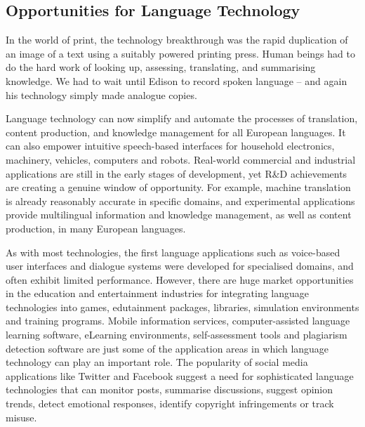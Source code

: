 \begin{multicols}{2}
\subsection{Opportunities for Language Technology}

In the world of print, the technology breakthrough was the rapid duplication of an image of a text using a suitably powered printing press. Human beings had to do the hard work of looking up, assessing, translating, and summarising knowledge. We had to wait until Edison to record spoken language – and again his technology simply made analogue copies.

Language technology can now simplify and automate the processes of translation, content production, and knowledge management for all European languages. It can also empower intuitive speech-based interfaces for household electronics, machinery, vehicles, computers and robots. Real-world commercial and industrial applications are still in the early stages of development, yet R\&D achievements are creating a genuine window of opportunity. For example, machine translation is already reasonably accurate in specific domains, and experimental applications provide multilingual information and knowledge management, as well as content production, in many European languages. 


As with most technologies, the first language applications such as voice-based user interfaces and dialogue systems were developed for specialised domains, and often exhibit limited performance. However, there are huge market opportunities in the education and entertainment industries for integrating language technologies into games, edutainment packages, libraries, simulation environments and training programs. Mobile information services, computer-assisted language learning software, eLearning environments, self-assessment tools and plagiarism detection software are just some of the application areas in which language technology can play an important role. The popularity of social media applications like Twitter and Facebook suggest a need for sophisticated language technologies that can monitor posts, summarise discussions, suggest opinion trends, detect emotional responses, identify copyright infringements or track misuse.


\end{multicols}
